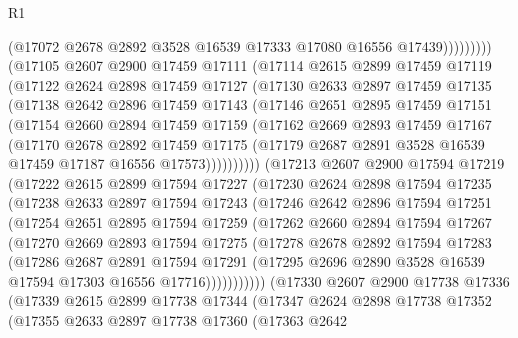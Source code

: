 \begin{lexlean}{R1}
\begin{coremodule}
                    (@17072 @2678 @2892 @3528 @16539 @17333 @17080 @16556 @17439)))))))))
    (@17105
      @2607
      @2900
      @17459
      @17111
      (@17114
        @2615
        @2899
        @17459
        @17119
        (@17122
          @2624
          @2898
          @17459
          @17127
          (@17130
            @2633
            @2897
            @17459
            @17135
            (@17138
              @2642
              @2896
              @17459
              @17143
              (@17146
                @2651
                @2895
                @17459
                @17151
                (@17154
                  @2660
                  @2894
                  @17459
                  @17159
                  (@17162
                    @2669
                    @2893
                    @17459
                    @17167
                    (@17170
                      @2678
                      @2892
                      @17459
                      @17175
                      (@17179 @2687 @2891 @3528 @16539 @17459 @17187 @16556 @17573))))))))))
    (@17213
      @2607
      @2900
      @17594
      @17219
      (@17222
        @2615
        @2899
        @17594
        @17227
        (@17230
          @2624
          @2898
          @17594
          @17235
          (@17238
            @2633
            @2897
            @17594
            @17243
            (@17246
              @2642
              @2896
              @17594
              @17251
              (@17254
                @2651
                @2895
                @17594
                @17259
                (@17262
                  @2660
                  @2894
                  @17594
                  @17267
                  (@17270
                    @2669
                    @2893
                    @17594
                    @17275
                    (@17278
                      @2678
                      @2892
                      @17594
                      @17283
                      (@17286
                        @2687
                        @2891
                        @17594
                        @17291
                        (@17295 @2696 @2890 @3528 @16539 @17594 @17303 @16556 @17716)))))))))))
    (@17330
      @2607
      @2900
      @17738
      @17336
      (@17339
        @2615
        @2899
        @17738
        @17344
        (@17347
          @2624
          @2898
          @17738
          @17352
          (@17355
            @2633
            @2897
            @17738
            @17360
            (@17363
              @2642

\end{coremodule}
\end{lexlean}
